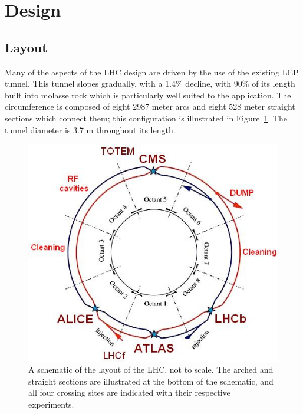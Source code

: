 
\section{Design}

\subsection{Layout}

Many of the aspects of the \ac{LHC} design are driven by the use of the existing \ac{LEP} tunnel. 
This tunnel slopes gradually, with a 1.4\% decline, with 90\% of its length built into molasse rock which is particularly well suited to the application.
The circumference is composed of eight 2987 meter arcs and eight 528 meter straight sections which connect them; this configuration is illustrated in Figure~\ref{fig:lhc_schematic}.
The tunnel diameter is 3.7 m throughout its length. 

\begin{figure}
\includegraphics[width=\fullfig]{figures/lhc_schematic.jpg}
\caption{A schematic of the layout of the \ac{LHC}, not to scale. The arched and straight sections are illustrated at the bottom of the schematic, and all four crossing sites are indicated with their respective experiments.}
\label{fig:lhc_schematic}
\end{figure}

